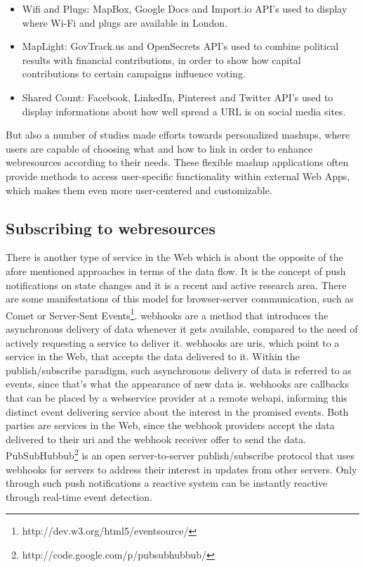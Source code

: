 \begin{itemize}
  \item \textrm{Wifi and Plugs}: MapBox, Google Docs and Import.io API's used to display where Wi-Fi and plugs are available in London.
  \item \textrm{MapLight}: GovTrack.us and OpenSecrets API's used to combine political results with financial contributions, in order to show how capital contributions to certain campaigns influence voting.
  \item \textrm{Shared Count}: Facebook, LinkedIn, Pinterest and Twitter API's used to display informations about how well spread a URL is on social media sites.
\end{itemize}

But also a number of studies\cite{10.1007/978-3-642-22233-7_11}\cite{4278815}\cite{Rizzotti:2010:UST:1772690.1772861}\cite{Stolee20131289} made efforts towards personalized \textrm{\glspl{mashup}}, where users are capable of choosing what and how to link in order to enhance \textrm{\glspl{webresource}} according to their needs.
These flexible \textrm{\gls{mashup}} applications often provide methods to access user-specific functionality within external \textrm{Web Apps}, which makes them even more user-centered and customizable.


\subsection{Subscribing to \glspl{webresource}}
There is another type of service in the Web which is about the opposite of the afore mentioned approaches in terms of the data flow.
It is the concept of push notifications on state changes and it is a recent and active research area.
There are some manifestations of this model for browser-server communication, such as \textrm{Comet}\cite{5631249} or \textrm{Server-Sent Events}\footnote{http://dev.w3.org/html5/eventsource/}.
\textrm{\glspl{webhook}} are a method that introduces the asynchronous delivery of data whenever it gets available, compared to the need of actively requesting a service to deliver it.
\textrm{\glspl{webhook}} are \textrm{\acrshort{uri}s}, which point to a service in the Web, that accepts the data delivered to it.
Within the publish/subscribe paradigm\cite{Eugster:2003:MFP:857076.857078}, such asynchronous delivery of data is referred to as events, since that's what the appearance of new data is.
\textrm{\glspl{webhook}} are callbacks that can be placed by a \textrm{\gls{webservice}} provider at a remote \textrm{\gls{webapi}}, informing this distinct event delivering service about the interest in the promised events.
Both parties are services in the Web, since the \textrm{\gls{webhook}} providers accept the data delivered to their \textrm{\acrshort{uri}} and the \textrm{\gls{webhook}} receiver offer to send the data.
\textrm{PubSubHubbub}\footnote{http://code.google.com/p/pubsubhubbub/} is an open server-to-server publish/subscribe protocol that uses \textrm{\glspl{webhook}} for servers to address their interest in updates from other servers.
Only through such push notifications a reactive system can be instantly reactive through real-time event detection.


